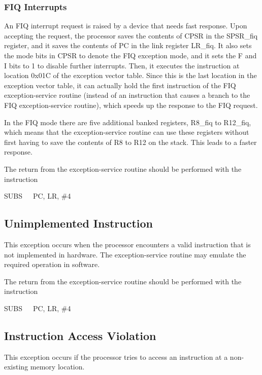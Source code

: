 \documentclass[11pt, twoside, pdftex]{article}
\begin{document}
\subsubsection{FIQ Interrupts}

An FIQ interrupt request is raised by a device that needs fast
response. Upon accepting the request, the processor 
saves the contents of CPSR in the SPSR\_fiq register, and
it saves the contents of PC in the link register LR\_fiq.
It also sets the mode bits in CPSR to denote the FIQ exception
mode, and it sets the F and I bits to 1 to disable further
interrupts. Then, it executes the instruction at location
0x01C of the exception vector table. Since this is the last 
location in the exception vector table, it can actually hold
the first instruction of the FIQ exception-service routine
(instead of an instruction that causes a branch to the FIQ
exception-service routine), which speeds up the response to
the FIQ request.

In the FIQ mode there are five additional banked registers,
R8\_fiq to R12\_fiq, which means that the exception-service 
routine can use these registers without first having to save the 
contents of R8 to R12 on the stack. This leads to a faster
response.

The return from the exception-service routine should be performed
with the instruction
\begin{center}
SUBS~~~PC, LR, \#4
\end{center}
\noindent

\subsection{Unimplemented Instruction}

This exception occurs when the processor encounters a valid
instruction that is not implemented in hardware. 
The exception-service routine may emulate the required operation
in software.

The return from the exception-service routine should be performed
with the instruction
\begin{center}
SUBS~~~PC, LR, \#4
\end{center}
\noindent

\subsection{Instruction Access Violation}

This exception occurs if the processor tries to access an
instruction at a non-existing memory location.
\end{document}
